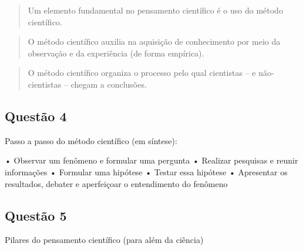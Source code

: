 \documentclass[
  letterpaper,
  DIV=11,
  numbers=noendperiod]{scrreprt}
\begin{document}
\begin{quote}
Um elemento fundamental no pensamento científico é o uso do método
científico.
\end{quote}

\begin{quote}
O método científico auxilia na aquisição de conhecimento por meio da
observação e da experiência (de forma empírica).
\end{quote}

\begin{quote}
O método científico organiza o processo pelo qual cientistas -- e
não-cientistas -- chegam a conclusões.
\end{quote}

\subsection{Questão 4}\label{questuxe3o-4}

Passo a passo do método científico (em síntese):

• Observar um fenômeno e formular uma pergunta • Realizar pesquisas e
reunir informações • Formular uma hipótese • Testar essa hipótese •
Apresentar os resultados, debater e aperfeiçoar o entendimento do
fenômeno

\subsection{Questão 5}\label{questuxe3o-5}

Pilares do pensamento científico (para além da ciência)
\end{document}
